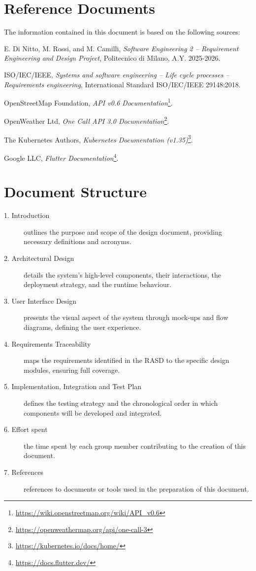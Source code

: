 \section{Reference Documents}
The information contained in this document is based on the following sources:
\begin{enumerate}[label={[\arabic*]}, leftmargin=*]

    \item E. Di Nitto, M. Rossi, and M. Camilli, \emph{Software Engineering 2 -- Requirement Engineering and Design Project}, Politecnico di Milano, A.Y. 2025-2026.

    \item ISO/IEC/IEEE, \emph{Systems and software engineering -- Life cycle processes -- Requirements engineering}, International Standard ISO/IEC/IEEE 29148:2018.

    \item OpenStreetMap Foundation, \emph{API v0.6 Documentation}\footnote{\url{https://wiki.openstreetmap.org/wiki/API_v0.6}}.

    \item OpenWeather Ltd, \emph{One Call API 3.0 Documentation}\footnote{\url{https://openweathermap.org/api/one-call-3}}.

    \item The Kubernetes Authors, \emph{Kubernetes Documentation (v1.35)}\footnote{\url{https://kubernetes.io/docs/home/}}.

    \item Google LLC, \emph{Flutter Documentation}\footnote{\url{https://docs.flutter.dev/}}.

\end{enumerate}
\section{Document Structure}
\begin{description}
    \item [1. Introduction] outlines the purpose and scope of the design document, providing necessary definitions and acronyms.
    \item [2. Architectural Design] details the system's high-level components, their interactions, the deployment strategy, and the runtime behaviour.
    \item [3. User Interface Design] presents the visual aspect of the system through mock-ups and flow diagrams, defining the user experience.
    \item [4. Requirements Traceability] maps the requirements identified in the RASD to the specific design modules, ensuring full coverage.
    \item [5. Implementation, Integration and Test Plan] defines the testing strategy and the chronological order in which components will be developed and integrated.
    \item [6. Effort spent] the time spent by each group member contributing to the creation of this document.
    \item [7. References] references to documents or tools used in the preparation of this document.
\end{description}
